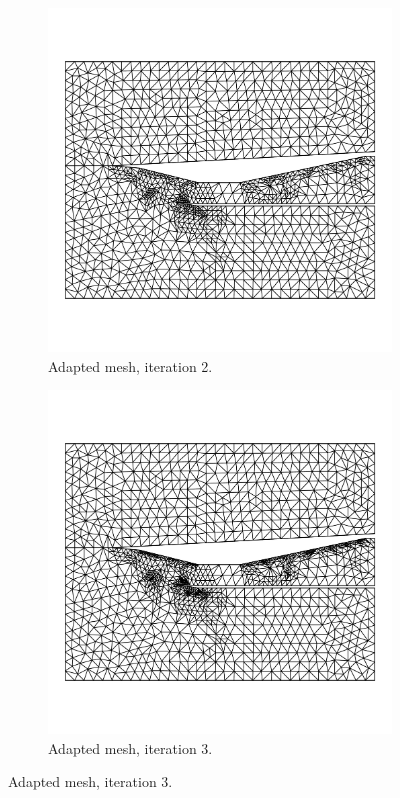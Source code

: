 \begin{figure}[h!]
    \begin{subfigure}[h]{0.39\linewidth}
        \centering
        \includegraphics[width=\linewidth]{rep/q4/mesh2.pdf}
        \caption{Adapted mesh, iteration 2.}
    \end{subfigure}
    \begin{subfigure}[h]{0.39\linewidth}
        \centering
        \includegraphics[width=\linewidth]{rep/q4/mesh3.pdf}
        \caption{Adapted mesh, iteration 3.}
    \end{subfigure}


\end{figure}
